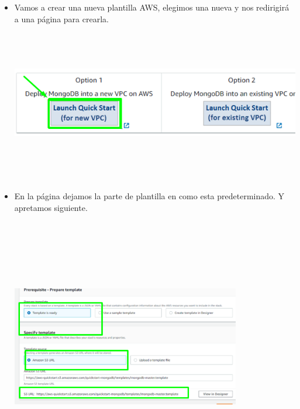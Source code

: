 \documentclass[12pt,a4paper,oneside]{book}
\begin{document}
\newpage
\begin{itemize}
	\item {Vamos a crear una nueva plantilla AWS, elegimos una nueva y nos redirigirá a una página para crearla.}\\
	
	\includegraphics[width=16cm, height=7cm]{img/7.png}\\
	
	\item {En la página dejamos la parte de plantilla en como esta predeterminado. Y apretamos siguiente.}\\
	
	\includegraphics[width=10cm, height=12cm]{img/8.png}\\
	
\end{itemize}
\end{document}
